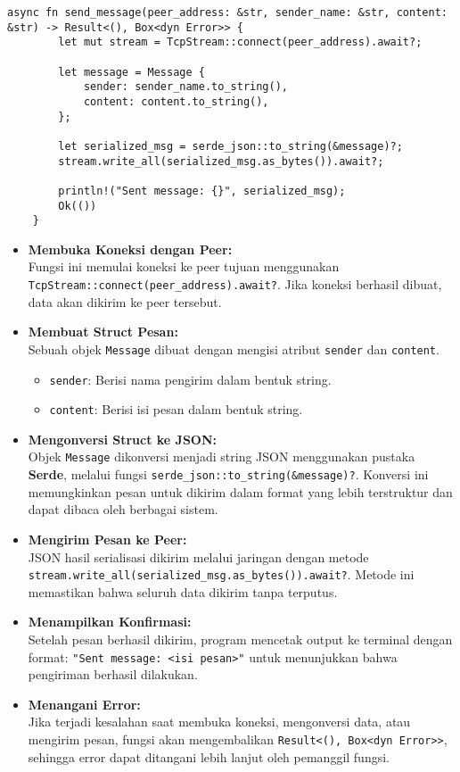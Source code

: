 \begin{lstlisting}[style=RustStyle]
	async fn send_message(peer_address: &str, sender_name: &str, content: &str) -> Result<(), Box<dyn Error>> {
		let mut stream = TcpStream::connect(peer_address).await?;
		
		let message = Message {
			sender: sender_name.to_string(),
			content: content.to_string(),
		};
		
		let serialized_msg = serde_json::to_string(&message)?;
		stream.write_all(serialized_msg.as_bytes()).await?;
		
		println!("Sent message: {}", serialized_msg);
		Ok(())
	}
\end{lstlisting}

\begin{itemize}
	\item \textbf{Membuka Koneksi dengan Peer:} \\
	Fungsi ini memulai koneksi ke peer tujuan menggunakan \texttt{TcpStream::connect(peer\_address).await?}. Jika koneksi berhasil dibuat, data akan dikirim ke peer tersebut.
	
	\item \textbf{Membuat Struct Pesan:} \\
	Sebuah objek \texttt{Message} dibuat dengan mengisi atribut \texttt{sender} dan \texttt{content}. 
	\begin{itemize}
		\item \texttt{sender}: Berisi nama pengirim dalam bentuk string.
		\item \texttt{content}: Berisi isi pesan dalam bentuk string.
	\end{itemize}
	
	\item \textbf{Mengonversi Struct ke JSON:} \\
	Objek \texttt{Message} dikonversi menjadi string JSON menggunakan pustaka \textbf{Serde}, melalui fungsi \texttt{serde\_json::to\_string(\&message)?}. Konversi ini memungkinkan pesan untuk dikirim dalam format yang lebih terstruktur dan dapat dibaca oleh berbagai sistem.
	
	\item \textbf{Mengirim Pesan ke Peer:} \\
	JSON hasil serialisasi dikirim melalui jaringan dengan metode \texttt{stream.write\_all(serialized\_msg.as\_bytes()).await?}. Metode ini memastikan bahwa seluruh data dikirim tanpa terputus.
	
	\item \textbf{Menampilkan Konfirmasi:} \\
	Setelah pesan berhasil dikirim, program mencetak output ke terminal dengan format: \texttt{"Sent message: <isi pesan>"} untuk menunjukkan bahwa pengiriman berhasil dilakukan.
	
	\item \textbf{Menangani Error:} \\
	Jika terjadi kesalahan saat membuka koneksi, mengonversi data, atau mengirim pesan, fungsi akan mengembalikan \texttt{Result<(), Box<dyn Error>>}, sehingga error dapat ditangani lebih lanjut oleh pemanggil fungsi.
\end{itemize}

